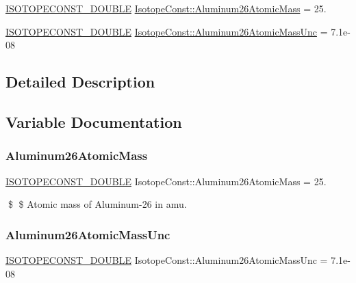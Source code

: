 \begin{DoxyCompactItemize}
\item 
\mbox{\hyperlink{group___isotope_const-_macros_ga8f45a7272ce02c0b4c65c44636ed719a}{I\+S\+O\+T\+O\+P\+E\+C\+O\+N\+S\+T\+\_\+\+D\+O\+U\+B\+LE}} \mbox{\hyperlink{group___isotope_const-_aluminum-_al26_ga6977d648ff171a31c05e90c23dedb2ce}{Isotope\+Const\+::\+Aluminum26\+Atomic\+Mass}} = 25.
\item 
\mbox{\hyperlink{group___isotope_const-_macros_ga8f45a7272ce02c0b4c65c44636ed719a}{I\+S\+O\+T\+O\+P\+E\+C\+O\+N\+S\+T\+\_\+\+D\+O\+U\+B\+LE}} \mbox{\hyperlink{group___isotope_const-_aluminum-_al26_ga654b4153a32f0d1c022746cfe17d99cc}{Isotope\+Const\+::\+Aluminum26\+Atomic\+Mass\+Unc}} = 7.\+1e-\/08
\end{DoxyCompactItemize}


\subsection{Detailed Description}


\subsection{Variable Documentation}
\mbox{\label{group___isotope_const-_aluminum-_al26_ga6977d648ff171a31c05e90c23dedb2ce}} 
\subsubsection{\texorpdfstring{Aluminum26\+Atomic\+Mass}{Aluminum26AtomicMass}}
{\footnotesize\ttfamily \mbox{\hyperlink{group___isotope_const-_macros_ga8f45a7272ce02c0b4c65c44636ed719a}{I\+S\+O\+T\+O\+P\+E\+C\+O\+N\+S\+T\+\_\+\+D\+O\+U\+B\+LE}} Isotope\+Const\+::\+Aluminum26\+Atomic\+Mass = 25.}

\$ \$ Atomic mass of Aluminum-\/26 in amu. \mbox{\label{group___isotope_const-_aluminum-_al26_ga654b4153a32f0d1c022746cfe17d99cc}} 
\subsubsection{\texorpdfstring{Aluminum26\+Atomic\+Mass\+Unc}{Aluminum26AtomicMassUnc}}
{\footnotesize\ttfamily \mbox{\hyperlink{group___isotope_const-_macros_ga8f45a7272ce02c0b4c65c44636ed719a}{I\+S\+O\+T\+O\+P\+E\+C\+O\+N\+S\+T\+\_\+\+D\+O\+U\+B\+LE}} Isotope\+Const\+::\+Aluminum26\+Atomic\+Mass\+Unc = 7.\+1e-\/08}

